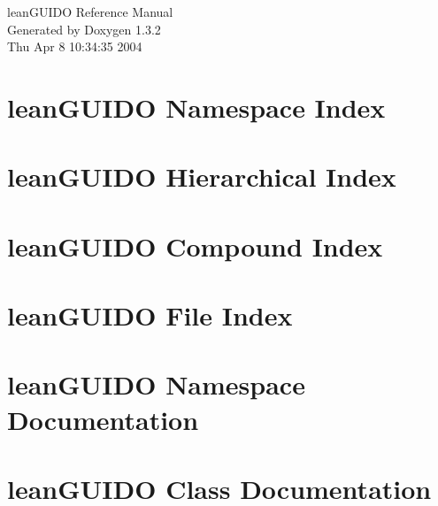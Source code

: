 \documentclass[a4paper]{book}
\begin{document}
\begin{titlepage}
\vspace*{7cm}
\begin{center}
{\Large lean\-GUIDO Reference Manual}\\
\vspace*{1cm}
{\large Generated by Doxygen 1.3.2}\\
\vspace*{0.5cm}
{\small Thu Apr 8 10:34:35 2004}\\
\end{center}
\end{titlepage}
\clearemptydoublepage
{}
\tableofcontents
\clearemptydoublepage
{}
\chapter{lean\-GUIDO Namespace Index}

\chapter{lean\-GUIDO Hierarchical Index}

\chapter{lean\-GUIDO Compound Index}

\chapter{lean\-GUIDO File Index}

\chapter{lean\-GUIDO Namespace Documentation}

\chapter{lean\-GUIDO Class Documentation}




















\end{document}
